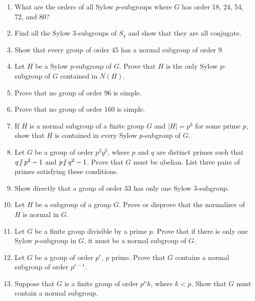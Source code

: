  
{\small
\begin{enumerate}

\item
What are the orders of all Sylow $p$-subgroups where $G$ has order 18, 24, 54, 72, and 80? 
 
\item
Find all the Sylow 3-subgroups of $S_4$ and show that they are all conjugate. 
 
\item
Show that every group of order 45 has a normal subgroup of order 9.
 
\item
Let $H$ be a Sylow $p$-subgroup of $G$.  Prove that $H$ is the only Sylow $p$-subgroup of $G$ contained in $N(H)$. 
 
\item
Prove that no group of order 96 is simple.

\item
Prove that no group of order 160 is simple.

\item
If $H$ is a normal subgroup of a finite group $G$ and $|H| = p^k$ for some prime $p$, show that $H$ is contained in every Sylow $p$-subgroup of $G$. 

\item
Let $G$ be a group of order $p^2 q^2$, where $p$ and $q$ are distinct primes such that $q {\not\:\mid\ } p^2 - 1$ and $p {\not\:\mid\ } q^2 - 1$. Prove that $G$ must be abelian.  List three pairs of primes satisfying these  conditions. 

\item
Show directly that a group of order 33 has only one Sylow 3-subgroup. 

\item
Let $H$ be a subgroup of a group $G$.  Prove or disprove that the normalizer of $H$ is normal in $G$. 
 
 
\item
Let $G$ be a finite group divisible by a prime $p$.  Prove that if there is only one Sylow $p$-subgroup in $G$, it must be a normal subgroup of $G$. 
 
\item
Let $G$ be a group of order $p^r$, $p$ prime. Prove that $G$ contains
a normal subgroup of order $p^{r-1}$. 
 
\item
Suppose that $G$ is a finite group of order $p^n k$, where $k < p$.
Show that $G$ must contain a normal subgroup.  
 

\end{enumerate}}
